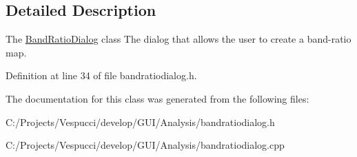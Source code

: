 \subsection{Detailed Description}
The \hyperlink{class_band_ratio_dialog}{Band\+Ratio\+Dialog} class The dialog that allows the user to create a band-\/ratio map. 

Definition at line 34 of file bandratiodialog.\+h.



The documentation for this class was generated from the following files\+:\begin{DoxyCompactItemize}
\item 
C\+:/\+Projects/\+Vespucci/develop/\+G\+U\+I/\+Analysis/bandratiodialog.\+h\item 
C\+:/\+Projects/\+Vespucci/develop/\+G\+U\+I/\+Analysis/bandratiodialog.\+cpp\end{DoxyCompactItemize}
